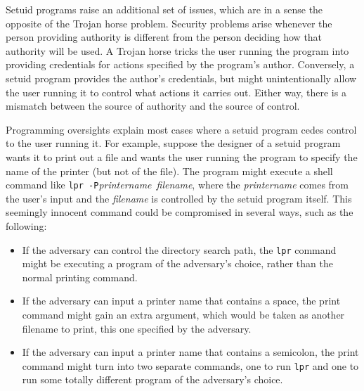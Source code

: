 Setuid programs raise an additional
set of issues, which are in a sense the opposite of the Trojan horse
problem.  Security problems arise whenever the person providing
authority is different from the person deciding how that authority
will be used.  A Trojan horse tricks the user running the program into
providing credentials for actions specified by the program's author.
Conversely, a setuid program provides the author's credentials, but
might unintentionally allow the user running it to control what
actions it carries out.  Either way, there is a mismatch between the
source of authority and the source of control.

Programming oversights explain most cases where a setuid program cedes
control to the user running it.  For example, suppose the designer of a setuid program
wants it to print out a file and wants the user running the program to
specify the name of the printer (but not of the file).
The program might execute a shell command like
\verb|lpr -P|\emph{printername}~\emph{filename}, where the
\emph{printername} comes from the user's input and the \emph{filename}
is controlled by the setuid program itself.  This seemingly innocent
command could be compromised in several ways, such as the following:
\begin{itemize}
\item
If the adversary can control the directory search path, the \verb|lpr|
command might be executing a program of the adversary's choice, rather
than the normal printing command.
\item
If the adversary can input a printer name that contains a space, the
print command might gain an extra argument, which would be taken as
another filename to print, this one specified by the adversary.
\item
If the adversary can input a printer name that contains a semicolon,
the print command might turn into two separate commands, one to run
\verb|lpr| and one to run some totally different program of the
adversary's choice.
\end{itemize}

